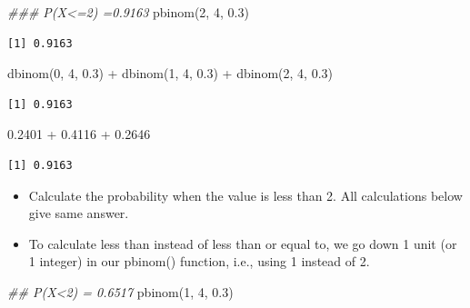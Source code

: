 \documentclass[
  letterpaper,
  DIV=11,
  numbers=noendperiod]{scrreprt}
\newenvironment{Shaded}{\begin{snugshade}}{\end{snugshade}}
\newcommand{\DecValTok}[1]{\textcolor[rgb]{0.68,0.00,0.00}{#1}}
\newcommand{\DocumentationTok}[1]{\textcolor[rgb]{0.37,0.37,0.37}{\textit{#1}}}
\newcommand{\FloatTok}[1]{\textcolor[rgb]{0.68,0.00,0.00}{#1}}
\newcommand{\FunctionTok}[1]{\textcolor[rgb]{0.28,0.35,0.67}{#1}}
\newcommand{\NormalTok}[1]{\textcolor[rgb]{0.00,0.23,0.31}{#1}}
\newcommand{\SpecialCharTok}[1]{\textcolor[rgb]{0.37,0.37,0.37}{#1}}
\providecommand{\tightlist}{%
  \setlength{\itemsep}{0pt}\setlength{\parskip}{0pt}}\usepackage{longtable,booktabs,array}
\begin{document}
\begin{Shaded}
\begin{Highlighting}[]
\DocumentationTok{\#\#\# P(X\textless{}=2) =0.9163}
\FunctionTok{pbinom}\NormalTok{(}\DecValTok{2}\NormalTok{, }\DecValTok{4}\NormalTok{, }\FloatTok{0.3}\NormalTok{)}
\end{Highlighting}
\end{Shaded}

\begin{verbatim}
[1] 0.9163
\end{verbatim}

\begin{Shaded}
\begin{Highlighting}[]
\FunctionTok{dbinom}\NormalTok{(}\DecValTok{0}\NormalTok{, }\DecValTok{4}\NormalTok{, }\FloatTok{0.3}\NormalTok{) }\SpecialCharTok{+} \FunctionTok{dbinom}\NormalTok{(}\DecValTok{1}\NormalTok{, }\DecValTok{4}\NormalTok{, }\FloatTok{0.3}\NormalTok{) }\SpecialCharTok{+} \FunctionTok{dbinom}\NormalTok{(}\DecValTok{2}\NormalTok{, }\DecValTok{4}\NormalTok{, }\FloatTok{0.3}\NormalTok{)}
\end{Highlighting}
\end{Shaded}

\begin{verbatim}
[1] 0.9163
\end{verbatim}

\begin{Shaded}
\begin{Highlighting}[]
\FloatTok{0.2401} \SpecialCharTok{+} \FloatTok{0.4116} \SpecialCharTok{+} \FloatTok{0.2646}
\end{Highlighting}
\end{Shaded}

\begin{verbatim}
[1] 0.9163
\end{verbatim}

\begin{itemize}
\tightlist
\item
  Calculate the probability when the value is less than 2. All
  calculations below give same answer.
\item
  To calculate less than instead of less than or equal to, we go down 1
  unit (or 1 integer) in our pbinom() function, i.e., using 1 instead of
  2.
\end{itemize}

\begin{Shaded}
\begin{Highlighting}[]
\DocumentationTok{\#\# P(X\textless{}2) = 0.6517}
\FunctionTok{pbinom}\NormalTok{(}\DecValTok{1}\NormalTok{, }\DecValTok{4}\NormalTok{, }\FloatTok{0.3}\NormalTok{)}
\end{Highlighting}
\end{Shaded}
\end{document}

